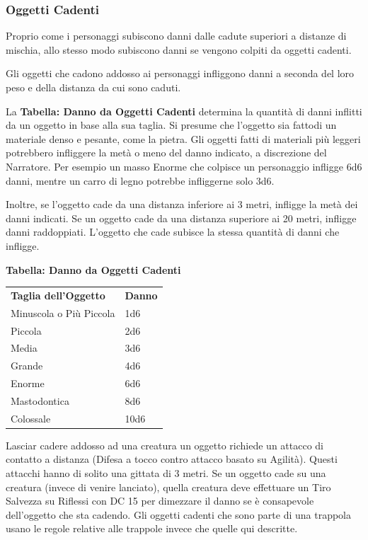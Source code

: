 \documentclass[a4paper,11pt,twoside,openany]{book}
\begin{document}
\subsubsection{Oggetti Cadenti}

\label{oggetti-cadenti}

Proprio come i personaggi subiscono danni dalle cadute superiori a distanze di mischia, allo stesso modo subiscono danni se vengono colpiti da oggetti cadenti.

Gli oggetti che cadono addosso ai personaggi infliggono danni a seconda del loro peso e della distanza da cui sono caduti.

La \textbf{Tabella: Danno da Oggetti Cadenti} determina la quantità di danni inflitti da un oggetto in base alla sua taglia. Si presume che l'oggetto sia fattodi un materiale denso e pesante, come la pietra.
Gli oggetti fatti di materiali più leggeri potrebbero infliggere la metà o meno del danno indicato, a discrezione del Narratore. Per esempio un masso Enorme che colpisce un personaggio infligge 6d6 danni, mentre un carro di legno potrebbe infliggerne solo 3d6.

Inoltre, se l'oggetto cade da una distanza inferiore ai 3 metri, infligge la metà dei danni indicati. Se un oggetto cade da una distanza superiore ai 20 metri, infligge danni raddoppiati. L'oggetto che cade subisce la stessa quantità di danni che infligge.

\bigskip

\textbf{Tabella: Danno da Oggetti Cadenti}

\begin{tabular}{ll}
	\toprule
	\textbf{Taglia dell'Oggetto} & \textbf{Danno}\tabularnewline
	Minuscola o Più Piccola      & 1d6\tabularnewline
	Piccola                      & 2d6\tabularnewline
	Media                        & 3d6\tabularnewline
	Grande                       & 4d6\tabularnewline
	Enorme                       & 6d6\tabularnewline
	Mastodontica                 & 8d6\tabularnewline
	Colossale                    & 10d6\tabularnewline
\end{tabular}

\bigskip

Lasciar cadere addosso ad una creatura un oggetto richiede un attacco di contatto a distanza (Difesa a tocco contro attacco basato su Agilità). Questi attacchi hanno di solito una gittata di 3 metri. Se un oggetto cade su una creatura (invece di venire lanciato), quella creatura deve effettuare un Tiro Salvezza su Riflessi con DC 15 per dimezzare il danno se è consapevole dell'oggetto che sta cadendo. Gli oggetti cadenti che sono parte di una trappola usano le regole relative alle trappole invece che quelle qui descritte.
\end{document}

